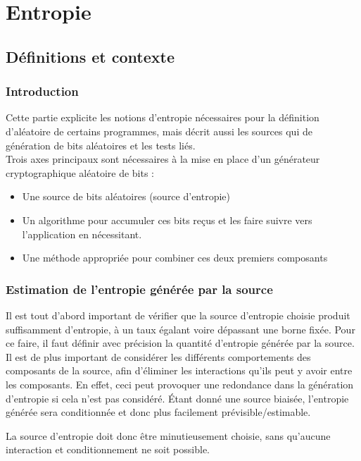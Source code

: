 \chapter{Entropie}
\section{Définitions et contexte}

\subsection{Introduction}
Cette partie explicite les notions d'entropie nécessaires pour la définition d'aléatoire de certains programmes, mais décrit aussi les sources qui de génération de bits aléatoires et les tests liés. \\



Trois axes principaux sont nécessaires à la mise en place d'un générateur cryptographique aléatoire de bits  : 
\begin{itemize}
\item Une source de bits aléatoires (source d'entropie)
\item Un algorithme pour accumuler ces bits reçus et les faire suivre vers l'application en nécessitant.
\item Une méthode appropriée pour combiner ces deux premiers composants\\
\end{itemize}


\subsection{Estimation de l'entropie générée par la source}
Il est tout d'abord important de vérifier que la source d'entropie choisie produit suffisamment d'entropie, à un taux égalant voire dépassant une borne fixée. Pour ce faire, il faut définir avec précision la quantité d'entropie générée par la source. Il est de plus important de considérer les différents comportements des composants de la source, afin d'éliminer les interactions qu'ils peut y avoir entre les composants. En effet, ceci peut provoquer une redondance dans la génération d'entropie si cela n'est pas considéré. Étant donné une source biaisée, l'entropie générée sera conditionnée et donc plus facilement prévisible/estimable.

La source d'entropie doit donc être minutieusement choisie, sans qu'aucune interaction et conditionnement ne soit possible.

